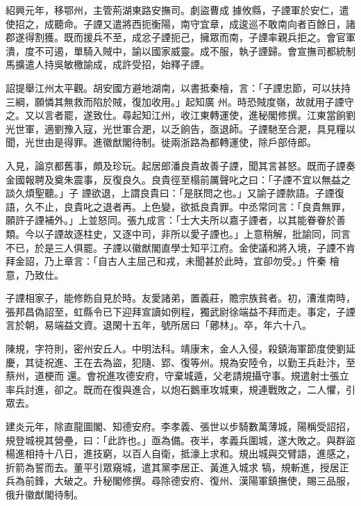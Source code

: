 \begin{pinyinscope}
 紹興元年，移鄂州，主管荊湖東路安撫司。劇盜曹成
 據攸縣，子諲軍於安仁，遣使招之，成聽命。子諲又遣將西扼衡陽，南守宜章，成逡巡不敢南向者百餘日，諸郡遂得割獲。既而援兵不至，成忿子諲扼己，擁眾而南，子諲率親兵拒之。會官軍潰，度不可遏，單騎入賊中，諭以國家威靈。成不服，執子諲歸。會宣撫司都統制馬擴遣人持吳敏檄諭成，成許受招，始釋子諲。



 詔提舉江州太平觀。胡安國方避地湖南，以書抵秦檜，言：「子諲忠節，可以扶持三綱，願憐其無救而陷於賊，復加收用。」起知廣
 州。時恐賊度嶺，故就用子諲守之。又以言者罷，遂致仕。尋起知江州，收江東轉運使，進秘閣修撰。江東當餉劉光世軍，適劉豫入寇，光世軍合淝，以乏餉告，亟退師。子諲馳至合淝，具見糧以聞，光世由是得罪。進徽猷閣待制。徙兩浙路為都轉運使，除戶部侍郎。



 入見，論京都舊事，頗及珍玩。起居郎潘良貴故善子諲，聞其言甚怒。既而子諲奏金國報聘及奠朱震事，反復良久。良貴徑至榻前厲聲叱之曰：「子諲不宜以無益之談久煩聖聽。」子
 諲欲退，上謂良貴曰：「是朕問之也。」又諭子諲款語。子諲復語，久不止，良貴叱之退者再。上色變，欲抵良貴罪。中丞常同言：「良貴無罪，願許子諲補外。」上並怒同。張九成言：「士大夫所以嘉子諲者，以其能眷眷於善類。今以子諲故逐柱史，又逐中司，非所以愛子諲也。」上意稍解，批諭同，同言不已，於是三人俱罷。子諲以徽猷閣直學士知平江府。金使議和將入境，子諲不肯拜金詔，乃上章言：「自古人主屈己和戎，未聞甚於此時，宜卻勿受。」忤秦
 檜意，乃致仕。



 子諲相家子，能修飭自見於時。友愛諸弟，置義莊，贍宗族貧者。初，漕淮南時，張邦昌偽詔至，虹縣令已下迎拜宣讀如例程，獨武尉徐端益不拜而走。事定，子諲言於朝，易端益文資。退閑十五年，號所居曰「薌林」。卒，年六十八。



 陳規，字符則，密州安丘人。中明法科。靖康末，金人入侵，殺鎮海軍節度使劉延慶，其徒祝進、王在去為盜，犯隨、郢、復等州。規為安陸令，以勤王兵赴汴，至蔡州，道梗而
 還。會祝進攻德安府，守棄城遁，父老請規攝守事。規遣射士張立率兵討進，卻之。既而在復與進合，以炮石鵝車攻城東，規連戰敗之，二人懼，引眾去。



 建炎元年，除直龍圖閣、知德安府。李孝義、張世以步騎數萬薄城，陽稱受詔招，規登城視其營壘，曰：「此詐也。」亟為備。夜半，孝義兵圍城，遂大敗之。與群盜楊進相持十八日，進技窮，以百人自衛，抵濠上求和。規出城與交臂語，進感之，折箭為誓而去。董平引眾窺城，遣其黨李居正、黃進入城求
 犒，規斬進，授居正兵為前鋒，大破之。升秘閣修撰。尋除德安府、復州、漢陽軍鎮撫使，賜三品服，俄升徽猷閣待制。




\end{pinyinscope}
